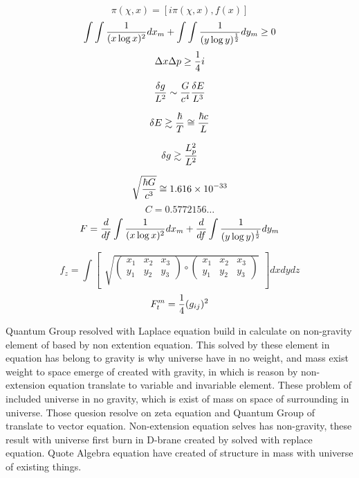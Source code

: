 \documentclass{jsarticle}
\begin{document}
  $$ \pi (\chi,x) = [i \pi (\chi,x),f(x)] $$
  $$ \int \int {1 \over (x \log x)^2}dx_{m} + \int \int {1 \over (y \log y)^{1 \over 2}}dy_{m} \ge 0 $$
  $$ \Delta x \Delta p \ge {1 \over 4}i $$

  $$ {\delta g \over L^2} \sim {G \over c^4}{\delta E \over L^3}  $$

  $$ \delta E \gtrsim {\hbar \over T} \cong {\hbar c \over L} $$

  $$ \delta g \gtrsim {L^2_{p} \over L^2} $$

  $$ \sqrt{\hbar G \over c^3} \cong 1.616 \times 10^{-33} $$
  $$ C = 0.5772156 \dots $$
  $$ F = {d \over df} \int {1 \over (x \log x)^2}dx_{m} + {d \over df} \int {1 \over (y \log y)^{1 \over 2}}dy_{m} $$

   $$ f_{z} = \int \begin{bmatrix} \sqrt{\begin{pmatrix} x_{1} & x_{2} & x_{3} \\
  y_{1} & y_{2} & y_{3} \end{pmatrix}
     \circ
   \begin{pmatrix} x_{1} & x_{2} & x_{3} \\
  y_{1} & y_{2} & y_{3} \end{pmatrix}}_{}
     \end{bmatrix}dxdydz $$
 $$ F^m_{t} = {1 \over 4}(g_{ij})^2 $$


  Quantum Group resolved with Laplace equation build in calculate on non-gravity element of based by non extention
equation. This solved by these element in equation has belong to gravity is why universe have in no weight,
and mass exist weight to space emerge of created with gravity, in which is reason by non-extension equation 
translate to variable and invariable element. These problem of included universe in no gravity, which is exist of mass
on space of surrounding in universe. Those quesion resolve on zeta equation and Quantum Group of translate to vector
equation. Non-extension equation selves has non-gravity, these result with universe first burn in D-brane created by 
solved with replace equation. Quote Algebra equation have created of structure in mass with universe of existing 
things.
\end{document}
